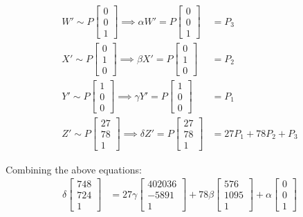 \documentclass[12pt, oneside]{article}
\begin{document}
\begin{align*}
  W' \sim P
   \begin{bmatrix}
  0   \\
  0   \\
  1  
  \end{bmatrix} \implies 
  \alpha W' = P
   \begin{bmatrix}
  0   \\
  0   \\
  1  
  \end{bmatrix}  &= P_3 \\
  X' \sim P
   \begin{bmatrix}
  0   \\
  1   \\
  0  
  \end{bmatrix} \implies 
  \beta X' = P
   \begin{bmatrix}
  0   \\
  1   \\
  0  
  \end{bmatrix}  &= P_2 \\
  Y' \sim P
   \begin{bmatrix}
  1   \\
  0   \\
  0  
  \end{bmatrix} \implies 
  \gamma Y' = P
   \begin{bmatrix}
  1   \\
  0   \\
  0  
  \end{bmatrix}   &= P_1 \\
  Z' \sim P
   \begin{bmatrix}
  27   \\
  78   \\
  1  
  \end{bmatrix} \implies 
  \delta Z' = P
   \begin{bmatrix}
  27   \\
  78   \\
  1  
  \end{bmatrix}   &= 27 P_1 + 78 P_2 + P_3
  \end{align*}
  
  Combining the above equations:
  \begin{align*}
  \delta  \begin{bmatrix} 748   \\ 724   \\ 1   \end{bmatrix}  &= 
  27 \gamma  \begin{bmatrix} 402036  \\ -5891 \\ 1  \end{bmatrix} + 
  78\beta \begin{bmatrix} 576   \\ 1095   \\   1   \end{bmatrix} + 
  \alpha \begin{bmatrix} 0   \\ 0   \\   1   \end{bmatrix} 
  \end{align*} 
\end{document}

